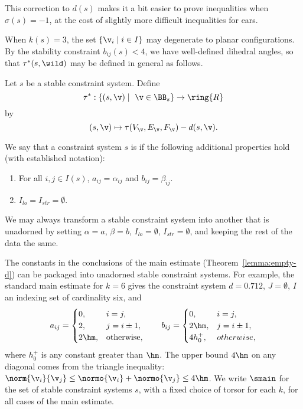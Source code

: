 This correction to $d(s)$  makes it a bit easier to prove inequalities when
$\sigma(s)=-1$, at the cost of slightly more difficult inequalities for ears.

When
$k(s)=3$,
the set $\{\v_i\mid i\in I\}$ may degenerate to planar
configurations. By the
stability
constraint $b_{ij}(s)<4$, we have well-defined dihedral angles, so
that $\tau^*(s,\wild)$ may be defined in general as follows.

\begin{definition}[$\tau^*$]\label{def:tau-star}
%
Let $s$ be a stable constraint system.  Define 
\[
\tau^*:\{(s,\v)\mid \ \v\in \BB_s\} \to \ring{R}
\] 
by
\[ 
(s,\v) \mapsto \tau(V_\v,E_\v,F_\v)-d(s,\v).
\] 
%
\end{definition}


\begin{definition}[unadorned]
We say that a constraint system $s$ is  if the following additional
properties hold (with established notation):
\begin{enumerate}
\item For all $i,j\in I(s)$,  $a_{ij}=\alpha_{ij}$ and $b_{ij}=\beta_{ij}$.
\item $I_{lo}=I_{str}=\emptyset$.
\end{enumerate}
\end{definition}


\begin{example}\label{ex:extend-cs} 
We may always transform a stable constraint system into another that is unadorned by
setting $\alpha=a$, $\beta=b$, $I_{lo}=\emptyset$, $I_{str}=\emptyset$, and
keeping the rest of the data the same.
\end{example}

\begin{definition}[$\smain$]\label{ex:main} 
The constants in the conclusions of the main estimate
  (Theorem~\ref{lemma:empty-d}) can be packaged into unadorned stable constraint
  systems.  For example, the standard main estimate for $k=6$ gives
  the constraint system $d=0.712$, $J=\emptyset$, $I$ an indexing set
  of cardinality six, and
\[
a_{ij} = \begin{cases} 0, & i=j,\\
  2, & j= i\pm1,\\
  2 \hm, & \text{otherwise},
  \end{cases}
\qquad
b_{ij}=\begin{cases}
 0, & i=j,\\
 2\hm, & j= i\pm1,\\
 4h_0^+, & otherwise,
  \end{cases}
\]
where $h_0^+$ is any constant greater than $\hm$.
The upper bound $4\hm$ on any diagonal comes from the triangle
inequality: $\norm{\v_i}{\v_j} \le \normo{\v_i}+\normo{\v_j} \le
4\hm$.   
We write $\smain$ for the set of stable constraint systems $s$, with a
fixed choice of torsor for each $k$, for all cases of the main
estimate.
\end{definition}
%

